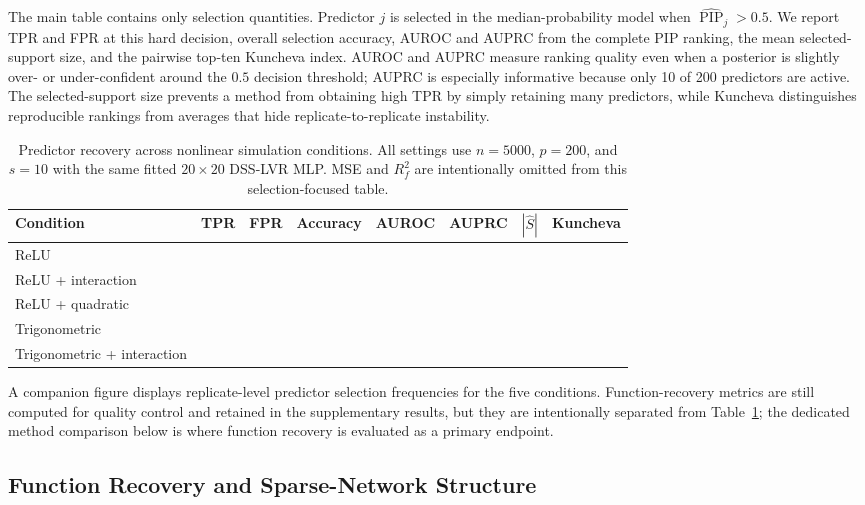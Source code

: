 The main table contains only selection quantities. Predictor $j$ is selected in the median-probability model when $\widehat{\operatorname{PIP}}_j>0.5$. We report TPR and FPR at this hard decision, overall selection accuracy, AUROC and AUPRC from the complete PIP ranking, the mean selected-support size, and the pairwise top-ten Kuncheva index. AUROC and AUPRC measure ranking quality even when a posterior is slightly over- or under-confident around the $0.5$ decision threshold; AUPRC is especially informative because only 10 of 200 predictors are active. The selected-support size prevents a method from obtaining high TPR by simply retaining many predictors, while Kuncheva distinguishes reproducible rankings from averages that hide replicate-to-replicate instability.

\begin{table}[t]
\centering
\small
\caption{Predictor recovery across nonlinear simulation conditions. All settings use $n=5000$, $p=200$, and $s=10$ with the same fitted $20\times20$ DSS-LVR MLP. MSE and $R_f^2$ are intentionally omitted from this selection-focused table.}
\label{tab:selection_conditions}
\begin{tabular}{lccccccc}
\toprule
Condition & TPR & FPR & Accuracy & AUROC & AUPRC & $|\widehat S|$ & Kuncheva \\
\midrule
ReLU & & & & & & & \\
ReLU + interaction & & & & & & & \\
ReLU + quadratic & & & & & & & \\
Trigonometric & & & & & & & \\
Trigonometric + interaction & & & & & & & \\
\bottomrule
\end{tabular}
\end{table}

A companion figure displays replicate-level predictor selection frequencies for the five conditions. Function-recovery metrics are still computed for quality control and retained in the supplementary results, but they are intentionally separated from Table~\ref{tab:selection_conditions}; the dedicated method comparison below is where function recovery is evaluated as a primary endpoint.

\subsection{Function Recovery and Sparse-Network Structure}
\label{sec:function_sparsity}

